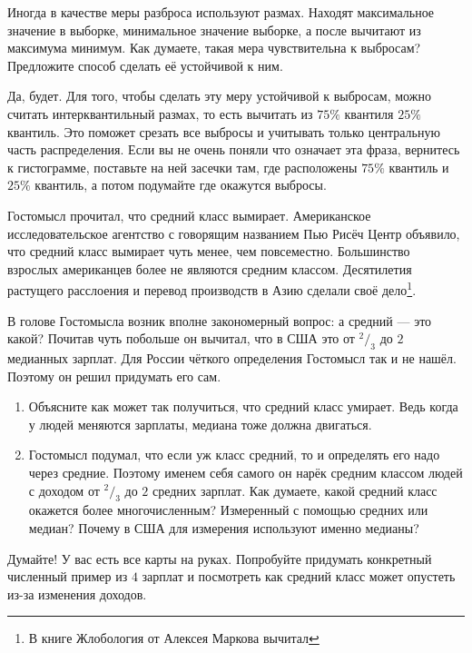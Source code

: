 \documentclass[12pt, a4paper, oneside]{article}
\theoremstyle{plain} %
\theoremstyle{definition}
\newcounter{problem}%
\renewcommand{\theproblem}{\arabic{problem}}
\newenvironment{problem}{
\addtocounter{problem}{1}\noindent{ \color{titleblue} \large \bfseries Упражнение~\theproblem \vspace{1ex} \newline}
}{ }
\begin{document}
\begin{problem}
Иногда в качестве меры разброса используют размах. Находят максимальное значение в выборке, минимальное значение выборке, а после вычитают из максимума минимум. Как думаете, такая мера чувствительна к выбросам? Предложите способ сделать её устойчивой к ним.
\end{problem}

\begin{solution}
Да, будет. Для того, чтобы сделать эту меру устойчивой к выбросам, можно считать интерквантильный размах, то есть вычитать из $75\%$ квантиля $25\%$ квантиль. Это поможет срезать все выбросы и учитывать только центральную часть распределения. Если вы не очень поняли что означает эта фраза, вернитесь к гистограмме, поставьте на ней засечки там, где расположены $75\%$ квантиль и $25\%$ квантиль, а потом подумайте где окажутся выбросы. 
\end{solution}

\begin{problem} 
Гостомысл прочитал, что средний класс вымирает. Американское исследовательское агентство с говорящим названием Пью Рисёч Центр объявило, что средний класс вымирает чуть менее, чем повсеместно. Большинство взрослых американцев более не являются средним классом. Десятилетия растущего расслоения и перевод производств в Азию сделали своё дело\footnote{В книге Жлобология от Алексея Маркова вычитал}. 

В голове Гостомысла возник вполне закономерный вопрос: а средний --- это какой? Почитав чуть побольше он вычитал, что в США это от $^2/_3$ до $2$ медианных зарплат. Для России чёткого определения Гостомысл так и не нашёл. Поэтому он решил придумать его сам.

\begin{enumerate} 
\item Объясните как может так получиться, что средний класс умирает. Ведь когда у людей меняются зарплаты, медиана тоже должна двигаться. 

\item Гостомысл подумал, что если уж класс средний, то и определять его надо через средние. Поэтому именем себя самого он нарёк средним классом людей с доходом от $^2/_3$ до $2$ средних зарплат. Как думаете, какой средний класс окажется более многочисленным? Измеренный с помощью средних или медиан? Почему в США для измерения используют именно медианы?
\end{enumerate} 
\end{problem} 

\begin{solution}
Думайте! У вас есть все карты на руках. Попробуйте придумать конкретный численный пример из $4$ зарплат и посмотреть как средний класс может опустеть из-за изменения доходов.
\end{solution} 
\end{document}
